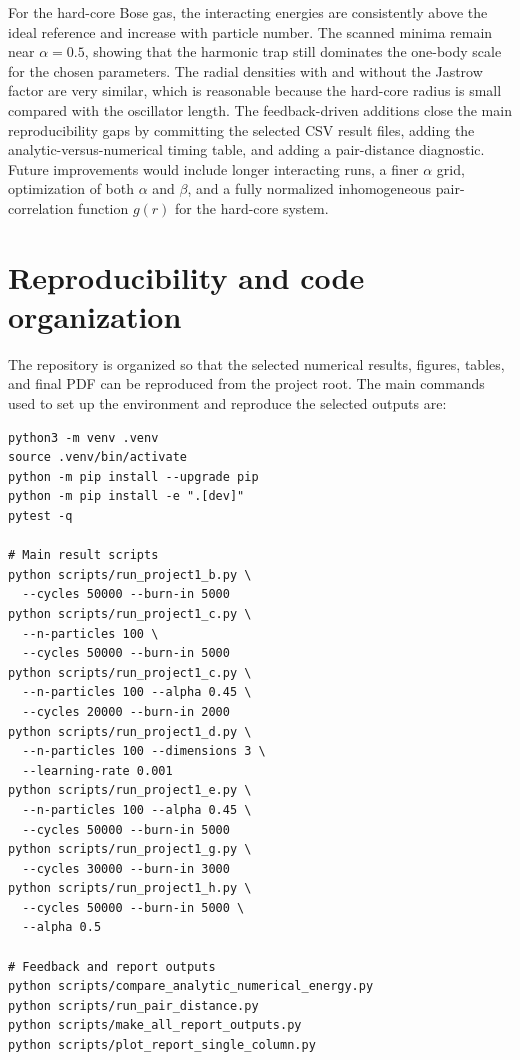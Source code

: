 \documentclass[10pt,a4paper]{article}
\begin{document}
For the hard-core Bose gas, the interacting energies are consistently above the ideal reference and increase with particle number. The scanned minima remain near $\alpha=0.5$, showing that the harmonic trap still dominates the one-body scale for the chosen parameters. The radial densities with and without the Jastrow factor are very similar, which is reasonable because the hard-core radius is small compared with the oscillator length. The feedback-driven additions close the main reproducibility gaps by committing the selected CSV result files, adding the analytic-versus-numerical timing table, and adding a pair-distance diagnostic. Future improvements would include longer interacting runs, a finer $\alpha$ grid, optimization of both $\alpha$ and $\beta$, and a fully normalized inhomogeneous pair-correlation function $g(r)$ for the hard-core system.


\appendix
\section{Reproducibility and code organization}\label{app:reproducibility}

The repository is organized so that the selected numerical results, figures,
tables, and final PDF can be reproduced from the project root. The main commands
used to set up the environment and reproduce the selected outputs are:

\begin{lstlisting}
python3 -m venv .venv
source .venv/bin/activate
python -m pip install --upgrade pip
python -m pip install -e ".[dev]"
pytest -q

# Main result scripts
python scripts/run_project1_b.py \
  --cycles 50000 --burn-in 5000
python scripts/run_project1_c.py \
  --n-particles 100 \
  --cycles 50000 --burn-in 5000
python scripts/run_project1_c.py \
  --n-particles 100 --alpha 0.45 \
  --cycles 20000 --burn-in 2000
python scripts/run_project1_d.py \
  --n-particles 100 --dimensions 3 \
  --learning-rate 0.001
python scripts/run_project1_e.py \
  --n-particles 100 --alpha 0.45 \
  --cycles 50000 --burn-in 5000
python scripts/run_project1_g.py \
  --cycles 30000 --burn-in 3000
python scripts/run_project1_h.py \
  --cycles 50000 --burn-in 5000 \
  --alpha 0.5

# Feedback and report outputs
python scripts/compare_analytic_numerical_energy.py
python scripts/run_pair_distance.py
python scripts/make_all_report_outputs.py
python scripts/plot_report_single_column.py
\end{lstlisting}
\end{document}
